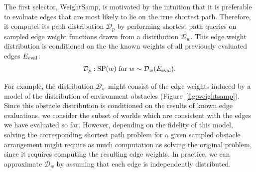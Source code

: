The first selector, WeightSamp,
is motivated by the intuition that it is preferable to evaluate edges
that are most likely to lie on the true shortest path.
Therefore,
it computes its path distribution $\mathcal{D}_p$
by performing shortest path queries
on sampled edge weight functions drawn from a distribution
$\mathcal{D}_w$.
This edge weight distribution is conditioned on the the known weights
of all previously evaluated edges $E_{\mbox{\scriptsize eval}}$:
\begin{equation}
   \mathcal{D}_p : \mbox{SP}(w)
   \mbox{ for } w \sim \mathcal{D}_w(E_{\mbox{\scriptsize eval}})
   \label{eqn:weightsamp}.
\end{equation}

For example,
the distribution $\mathcal{D}_w$ might consist of
the edge weights induced by a model of the distribution of
environment obstacles
(Figure~\ref{fig:weightsamp}).
Since this obstacle distribution is conditioned on the results
of known edge evaluations,
we consider the subset of worlds which are consistent
with the edges we have evaluated so far.
However,
depending on the fidelity of this model,
solving the corresponding shortest path problem for a given
sampled obstacle arrangement might require as much computation as
solving the original problem,
since it requires computing the resulting edge weights.
In practice,
we can approximate $\mathcal{D}_w$
by assuming that each edge is independently distributed.

